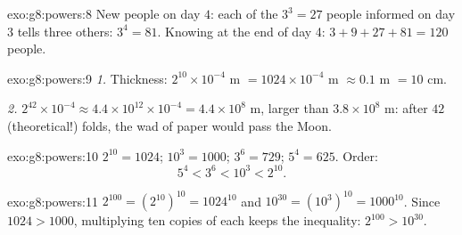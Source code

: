 \begin{solution}{exo:g8:powers:8}
New people on day $4$: each of the $3^3 = 27$ people informed on day
3 tells three others: $3^4 = 81$. Knowing at the end of day 4:
$3 + 9 + 27 + 81 = 120$ people.
\end{solution}

\begin{solution}{exo:g8:powers:9}
\emph{1.} Thickness: $2^{10} \times 10^{-4}$ m
$= 1024 \times 10^{-4}$ m $\approx 0.1$ m $= 10$ cm.

\emph{2.} $2^{42} \times 10^{-4} \approx 4.4 \times 10^{12} \times
10^{-4} = 4.4 \times 10^8$ m, larger than $3.8 \times 10^8$ m: after
$42$ (theoretical!) folds, the wad of paper would pass the Moon.
\end{solution}

\begin{solution}{exo:g8:powers:10}
$2^{10} = 1024$; $10^3 = 1000$; $3^6 = 729$; $5^4 = 625$. Order:
\[
5^4 < 3^6 < 10^3 < 2^{10} .
\]
\end{solution}

\begin{solution}{exo:g8:powers:11}
$2^{100} = \left(2^{10}\right)^{10} = 1024^{10}$ and
$10^{30} = \left(10^3\right)^{10} = 1000^{10}$. Since $1024 > 1000$,
multiplying ten copies of each keeps the inequality:
$2^{100} > 10^{30}$.
\end{solution}

